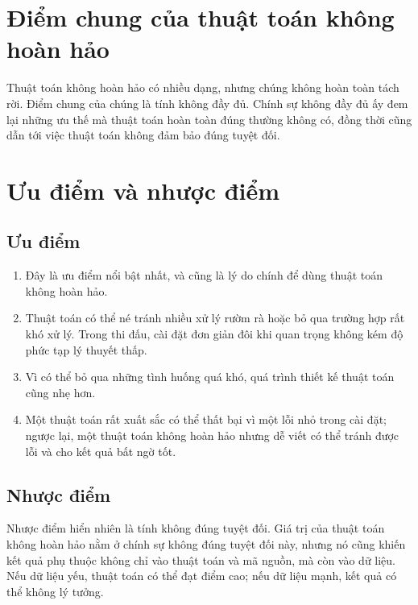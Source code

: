 \documentclass[11pt]{article}
\begin{document}
\section{Điểm chung của thuật toán không hoàn hảo}

Thuật toán không hoàn hảo có nhiều dạng, nhưng chúng không hoàn toàn tách rời.
Điểm chung của chúng là tính không đầy đủ. Chính sự không đầy đủ ấy đem lại
những ưu thế mà thuật toán hoàn toàn đúng thường không có, đồng thời cũng dẫn
tới việc thuật toán không đảm bảo đúng tuyệt đối.

\section{Ưu điểm và nhược điểm}

\subsection{Ưu điểm}

\begin{enumerate}
  \item {} Đây là ưu điểm nổi bật nhất,
  và cũng là lý do chính để dùng thuật toán không hoàn hảo.
  \item {} Thuật toán có thể né tránh nhiều
  xử lý rườm rà hoặc bỏ qua trường hợp rất khó xử lý. Trong thi đấu, cài đặt
  đơn giản đôi khi quan trọng không kém độ phức tạp lý thuyết thấp.
  \item {} Vì có thể bỏ qua những tình huống
  quá khó, quá trình thiết kế thuật toán cũng nhẹ hơn.
  \item {} Một thuật toán rất xuất sắc có thể thất bại
  vì một lỗi nhỏ trong cài đặt; ngược lại, một thuật toán không hoàn hảo nhưng
  dễ viết có thể tránh được lỗi và cho kết quả bất ngờ tốt.
\end{enumerate}

\subsection{Nhược điểm}

Nhược điểm hiển nhiên là tính không đúng tuyệt đối. Giá trị của thuật toán
không hoàn hảo nằm ở chính sự không đúng tuyệt đối này, nhưng nó cũng khiến
kết quả phụ thuộc không chỉ vào thuật toán và mã nguồn, mà còn vào dữ liệu.
Nếu dữ liệu yếu, thuật toán có thể đạt điểm cao; nếu dữ liệu mạnh, kết quả có
thể không lý tưởng.
\end{document}

